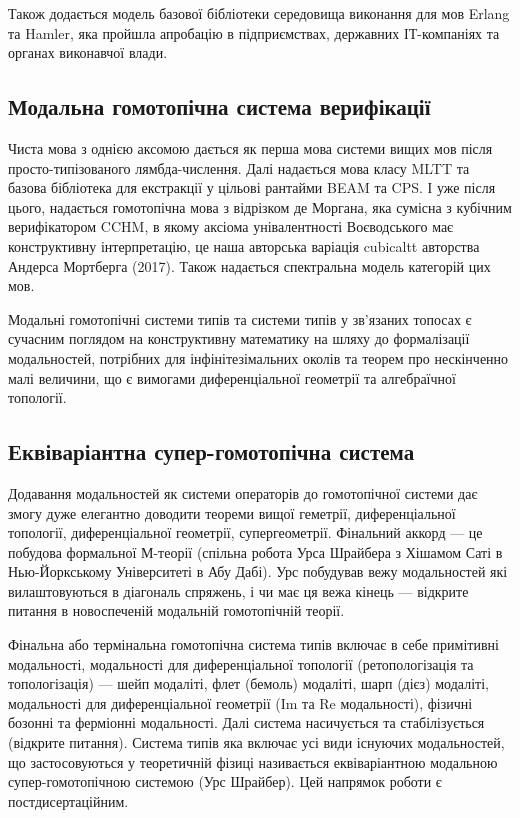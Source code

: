 Також додається модель базової бібліотеки середовища виконання для мов Erlang та Hamler,
яка пройшла апробацію в підприємствах, державних ІТ-компаніях та органах виконавчої влади.

\subsection{Модальна гомотопічна система верифікації}
Чиста мова з однією аксомою дається як перша мова системи вищих мов після просто-типізованого лямбда-числення.
Далі надається мова класу MLTT та базова бібліотека для екстракції у цільові рантайми BEAM та CPS.
І уже після цього, надається гомотопічна мова з відрізком де Моргана, яка сумісна з кубічним верифікатором CCHM,
в якому аксіома унівалентності Воєводського має конструктивну інтерпретацію,
це наша авторська варіація cubicaltt авторства Андерса Мортберга (2017).
Також надається спектральна модель категорій цих мов.

Модальні гомотопічні системи типів та системи типів у зв'язаних топосах є сучасним поглядом на
конструктивну математику на шляху до формалізації модальностей, потрібних для інфінітезімальних околів та
теорем про нескінченно малі величини, що є вимогами диференціальної геометрії та алгебраїчної топології.

\subsection{Еквіваріантна супер-гомотопічна система}
Додавання модальностей як системи операторів до гомотопічної системи дає змогу дуже
елегантно доводити теореми вищої геметрії, диференціальної топології, диференціальної
геометрії, супергеометрії. Фінальний аккорд --- це побудова формальної М-теорії (спільна робота Урса Шрайбера
з Хішамом Саті в Нью-Йоркському Університеті в Абу Дабі). Урс побудував вежу модальностей які вилаштовуються
в діагональ спряжень, і чи має ця вежа кінець --- відкрите питання в новоспеченій модальній гомотопічній теорії.

Фінальна або термінальна гомотопічна система типів включає в себе примітивні модальності,
модальності для диференціальної топології (ретопологізація та топологізація) --- шейп модаліті,
флет (бемоль) модаліті, шарп (дієз) модаліті, модальності для диференціальної
геометрії (Im та Re модальності), фізичні бозонні та ферміонні модальності. Далі система
насичується та стабілізується (відкрите питання). Система типів яка включає
усі види існуючих модальностей, що застосовуються у теоретичній фізиці називається еквіваріантною
модальною супер-гомотопічною системою (Урс Шрайбер). Цей напрямок роботи є постдисертаційним.

